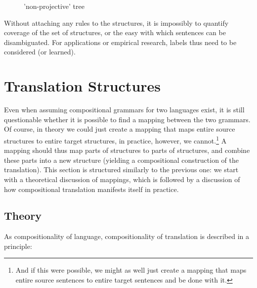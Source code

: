 \documentclass{report}
\theoremstyle{definition}
\theoremstyle{plain}
\begin{document}
\begin{figure}[!ht]
\centering
{}
\caption{'non-projective' tree}\label{fig:struct3}
\end{figure}

Without attaching any rules to the structures, it is impossibly to quantify coverage of the set of structures, or the easy with which sentences can be disambiguated. For applications or empirical research, labels thus need to be considered (or learned).

\section{Translation Structures}

Even when assuming compositional grammars for two languages exist, it is still questionable whether it is possible to find a mapping between the two grammars. Of course, in theory we could just create a mapping that maps entire source structures to entire target structures, in practice, however, we cannot.\footnote{And if this were possible, we might as well just create a mapping that maps entire source sentences to entire target sentences and be done with it.} A mapping should thus map parts of structures to parts of structures, and combine these parts into a new structure (yielding a compositional construction of the translation). This section is structured similarly to the previous one: we start with a theoretical discussion of mappings, which is followed by a discussion of how compositional translation manifests itself in practice.
 
\subsection{Theory}

As compositionality of language, compositionality of translation is described in a principle:
\end{document}
